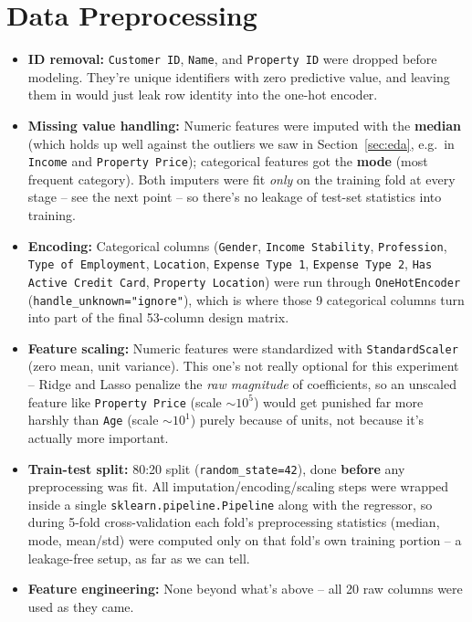 \documentclass[12pt,a4paper]{article}
\begin{document}
\section{Data Preprocessing}\label{sec:preprocessing}

\begin{itemize}
\item \textbf{ID removal:} \texttt{Customer ID}, \texttt{Name}, and \texttt{Property ID} were dropped before modeling. They're unique identifiers with zero predictive value, and leaving them in would just leak row identity into the one-hot encoder.
\item \textbf{Missing value handling:} Numeric features were imputed with the \textbf{median} (which holds up well against the outliers we saw in Section~\ref{sec:eda}, e.g.\ in \texttt{Income} and \texttt{Property Price}); categorical features got the \textbf{mode} (most frequent category). Both imputers were fit \textit{only} on the training fold at every stage -- see the next point -- so there's no leakage of test-set statistics into training.
\item \textbf{Encoding:} Categorical columns (\texttt{Gender}, \texttt{Income Stability}, \texttt{Profession}, \texttt{Type of Employment}, \texttt{Location}, \texttt{Expense Type 1}, \texttt{Expense Type 2}, \texttt{Has Active Credit Card}, \texttt{Property Location}) were run through \texttt{OneHotEncoder} (\texttt{handle\_unknown="ignore"}), which is where those 9 categorical columns turn into part of the final 53-column design matrix.
\item \textbf{Feature scaling:} Numeric features were standardized with \texttt{StandardScaler} (zero mean, unit variance). This one's not really optional for this experiment -- Ridge and Lasso penalize the \textit{raw magnitude} of coefficients, so an unscaled feature like \texttt{Property Price} (scale $\sim10^5$) would get punished far more harshly than \texttt{Age} (scale $\sim10^1$) purely because of units, not because it's actually more important.
\item \textbf{Train-test split:} 80:20 split (\texttt{random\_state=42}), done \textbf{before} any preprocessing was fit. All imputation/encoding/scaling steps were wrapped inside a single \texttt{sklearn.pipeline.Pipeline} along with the regressor, so during 5-fold cross-validation each fold's preprocessing statistics (median, mode, mean/std) were computed only on that fold's own training portion -- a leakage-free setup, as far as we can tell.
\item \textbf{Feature engineering:} None beyond what's above -- all 20 raw columns were used as they came.
\end{itemize}
\end{document}
